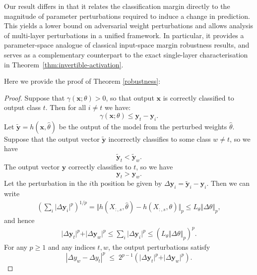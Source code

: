 \documentclass{article}
\theoremstyle{plain}
\theoremstyle{definition}
\theoremstyle{remark}
\begin{document}
Our result differs in that it relates the classification margin directly to the magnitude of parameter perturbations required to induce a change in prediction. This yields a lower bound on adversarial weight perturbations and allows analysis of multi-layer perturbations in a unified framework. In particular, it provides a parameter-space analogue of classical input-space margin robustness results, and serves as a complementary counterpart to the exact single-layer characterisation in Theorem~\ref{thm:invertible-activation}.

Here we provide the proof of Theorem \ref{robustness}:
\begin{proof}
    Suppose that $\gamma(\mathbf x;\theta) > 0$, so that output $\mathbf x$ is correctly classified to output class $t$. Then for all $i \neq t$ we have:
    \begin{equation}
        \gamma(\mathbf x;\theta)  \leq \mathbf{y}_{t} - \mathbf{y}_i.
    \end{equation}
    Let $\tilde{\mathbf y}= h(\mathbf x, \hat{\theta})$ be the output of the model from the perturbed weights $\hat{\theta}$.
    Suppose that the output vector $\tilde{\mathbf{y}}$ incorrectly classifies to some class $w \neq t$, so we have 
    \begin{equation}
        \tilde{\mathbf{y}}_{t} < \tilde{\mathbf{y}}_w.
    \end{equation}
    The output vector $\mathbf{y}$ correctly classifies to $t$, so we have
    \begin{equation}
    \mathbf{y}_{t} > \mathbf{y}_w.
    \end{equation}
    Let the perturbation in the $i$th position be given by $\Delta \mathbf{y}_i = \tilde{\mathbf{y}}_i -\mathbf{y}_i$.
    Then we can write
    \begin{align}
        \left( \sum_i \vert \Delta \mathbf{y}_i \vert^p \right)^{1/p} = \Vert h(X_{:,s}, \hat{\theta} ) - h(X_{:,s}, \theta ) \Vert_p  \leq L_\theta \Vert \Delta\theta\Vert_p ,
    \end{align}
    and hence
    \begin{align}
        \vert \Delta \mathbf{y}_t \vert^p + \vert \Delta \mathbf{y}_w \vert^p \leq \sum_i \vert \Delta \mathbf{y}_i \vert^p \leq (L_\theta \Vert \Delta\theta\Vert_p )^p.
    \end{align}
    For any $p\ge1$ and any indices $t,w$, the output perturbations satisfy \citep{li_preventing_2019}
    \[
    |\Delta y_w - \Delta y_t|^p
    \;\le\; 2^{p-1}( \vert \Delta \mathbf{y}_t \vert^p + \vert \Delta \mathbf{y}_w \vert^p ).
\]
\end{proof}
\end{document}
